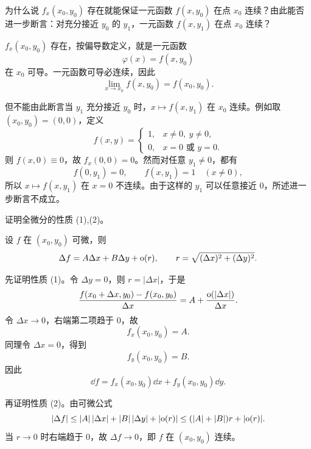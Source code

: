 \begin{xthought}[1]
为什么说 $f_x(x_0,y_0)$ 存在就能保证一元函数 $f(x,y_0)$ 在点 $x_0$ 连续？由此能否进一步断言：对充分接近 $y_0$ 的 $y_1$，一元函数 $f(x,y_1)$ 在点 $x_0$ 连续？
\end{xthought}
\begin{xsolution}
$f_x(x_0,y_0)$ 存在，按偏导数定义，就是一元函数
\[
  \varphi(x)=f(x,y_0)
\]
在 $x_0$ 可导。一元函数可导必连续，因此
\[
  \lim_{x\to x_0}f(x,y_0)=f(x_0,y_0).
\]

但不能由此断言当 $y_1$ 充分接近 $y_0$ 时，$x\mapsto f(x,y_1)$ 在 $x_0$ 连续。例如取 $(x_0,y_0)=(0,0)$，定义
\[
  f(x,y)=
  \begin{cases}
    1,&x\ne0,\ y\ne0,\\
    0,&x=0\text{ 或 }y=0.
  \end{cases}
\]
则 $f(x,0)\equiv0$，故 $f_x(0,0)=0$。然而对任意 $y_1\ne0$，都有
\[
  f(0,y_1)=0,\qquad f(x,y_1)=1\quad(x\ne0),
\]
所以 $x\mapsto f(x,y_1)$ 在 $x=0$ 不连续。由于这样的 $y_1$ 可以任意接近 $0$，所述进一步断言不成立。
\end{xsolution}


\begin{xthought}[2]
证明全微分的性质 (1),(2)。
\end{xthought}
\begin{xsolution}
设 $f$ 在 $(x_0,y_0)$ 可微，则
\[
  \Delta f=A\Delta x+B\Delta y+\mathrm{o}(r),
  \qquad r=\sqrt{(\Delta x)^2+(\Delta y)^2}.
\]

先证明性质 (1)。令 $\Delta y=0$，则 $r=|\Delta x|$，于是
\[
  \frac{f(x_0+\Delta x,y_0)-f(x_0,y_0)}{\Delta x}
  =A+\frac{\mathrm{o}(|\Delta x|)}{\Delta x}.
\]
令 $\Delta x\to0$，右端第二项趋于 $0$，故
\[
  f_x(x_0,y_0)=A.
\]
同理令 $\Delta x=0$，得到
\[
  f_y(x_0,y_0)=B.
\]
因此
\[
  \dd f=f_x(x_0,y_0)\dd x+f_y(x_0,y_0)\dd y.
\]

再证明性质 (2)。由可微公式
\[
  |\Delta f|
  \le |A|\,|\Delta x|+|B|\,|\Delta y|+|\mathrm{o}(r)|
  \le (|A|+|B|)r+|\mathrm{o}(r)|.
\]
当 $r\to0$ 时右端趋于 $0$，故 $\Delta f\to0$，即 $f$ 在 $(x_0,y_0)$ 连续。
\end{xsolution}


